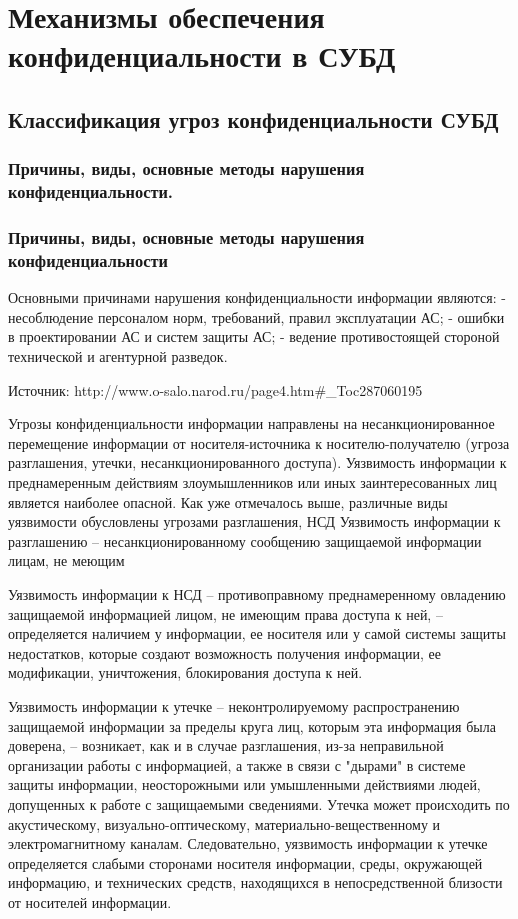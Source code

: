\section{Механизмы обеспечения конфиденциальности в СУБД}
\subsection{Классификация угроз конфиденциальности СУБД}
\subsubsection{Причины, виды, основные методы нарушения конфиденциальности.}

\subsubsection{Причины, виды, основные методы нарушения конфиденциальности}

Основными причинами нарушения конфиденциальности информации являются:
-     несоблюдение персоналом норм, требований, правил эксплуатации АС;
-     ошибки в проектировании АС и систем защиты АС;
-     ведение противостоящей стороной технической и агентурной разведок.


Источник: http://www.o-salo.narod.ru/page4.htm#\_Toc287060195

Угрозы конфиденциальности информации направлены на несанкционированное перемещение информации от носителя-источника к носителю-получателю (угроза разглашения, утечки, несанкционированного доступа).
Уязвимость информации к преднамеренным действиям злоумышленников или иных заинтересованных лиц является наиболее опасной. Как уже отмечалось выше, различные виды уязвимости обусловлены угрозами разглашения, НСД %
Уязвимость информации к разглашению – несанкционированному сообщению защищаемой информации лицам, не меющим %

Уязвимость информации к НСД – противоправному преднамеренному овладению защищаемой информацией лицом, не имеющим права доступа к ней, – определяется наличием у информации, ее носителя или у самой системы защиты недостатков, которые создают возможность получения информации, ее модификации, уничтожения, блокирования доступа к ней.

Уязвимость информации к утечке – неконтролируемому распространению защищаемой информации за пределы круга лиц, которым эта информация была доверена, – возникает, как и в случае разглашения, из-за неправильной организации работы с информацией, а также в связи с "дырами" в системе защиты информации, неосторожными или умышленными действиями людей, допущенных к работе с защищаемыми сведениями. Утечка может происходить по акустическому, визуально-оптическому, материально-вещественному и электромагнитному каналам. Следовательно, уязвимость информации к утечке определяется слабыми сторонами носителя информации, среды, окружающей информацию, и технических средств, находящихся в непосредственной близости от носителей информации.

